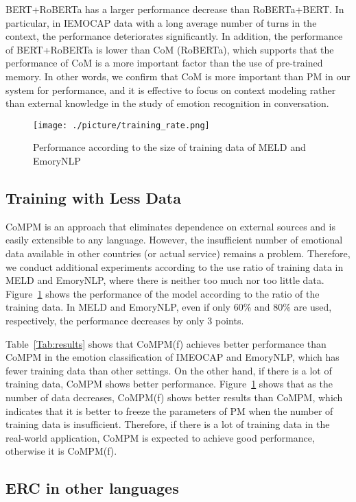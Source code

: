 \documentclass[11pt]{article}
\begin{document}
BERT+RoBERTa has a larger performance decrease than RoBERTa+BERT. In particular, in IEMOCAP data with a long average number of turns in the context, the performance deteriorates significantly. In addition, the performance of BERT+RoBERTa is lower than CoM (RoBERTa), which supports that the performance of CoM is a more important factor than the use of pre-trained memory. In other words, we confirm that CoM is more important than PM in our system for performance, and it is effective to focus on context modeling rather than external knowledge in the study of emotion recognition in conversation.


\begin{figure}[!t]
    \centering 
    \texttt{[image: ./picture/training\_rate.png]}
    \caption{Performance according to the size of training data of MELD and EmoryNLP}
    \label{fig:training_rate}
\end{figure}

\subsection{Training with Less Data}
\label{sec:less}
CoMPM is an approach that eliminates dependence on external sources and is easily extensible to any language. However, the insufficient number of emotional data available in other countries (or actual service) remains a problem. Therefore, we conduct additional experiments according to the use ratio of training data in MELD and EmoryNLP, where there is neither too much nor too little data. Figure~\ref{fig:training_rate} shows the performance of the model according to the ratio of the training data. In MELD and EmoryNLP, even if only 60\% and 80\% are used, respectively, the performance decreases by only 3 points.


Table~\ref{Tab:results} shows that CoMPM(f) achieves better performance than CoMPM in the emotion classification of IMEOCAP and EmoryNLP, which has fewer training data than other settings. On the other hand, if there is a lot of training data, CoMPM shows better performance. Figure~\ref{fig:training_rate} shows that as the number of data decreases, CoMPM(f) shows better results than CoMPM, which indicates that it is better to freeze the parameters of PM when the number of training data is insufficient. Therefore, if there is a lot of training data in the real-world application, CoMPM is expected to achieve good performance, otherwise it is CoMPM(f).


\subsection{ERC in other languages}
\label{sec:other_languages}
\end{document}

